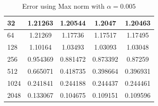 \begin{table}[H]
\begin{tabular}{lcccc}
		\midrule
		\hspace{7mm} 32 & 1.21263  & 1.20544   & 1.2047    & 1.20463   \\
		\midrule
		\hspace{7mm} 64 & 1.21269  & 1.17736   & 1.17517   & 1.17495   \\
		\midrule
		\hspace{7mm} 128 & 1.10164  & 1.03493   & 1.03093   & 1.03048   \\
		\midrule
		\hspace{7mm} 256 & 0.954369 & 0.881472  & 0.873392  & 0.87259   \\
		\midrule
		\hspace{7mm} 512 & 0.665071 & 0.418735  & 0.398664  & 0.396931  \\
		\midrule
		\hspace{7mm} 1024 & 0.241841 & 0.244188  & 0.244437  & 0.244461  \\
		\midrule
		\hspace{7mm} 2048 & 0.133067 & 0.104675  & 0.109151  & 0.109596  \\
		\bottomrule
	\end{tabular}
	\caption{Error using Max norm with $\alpha =0.005$}
	\label{Galerkin_tabla_max_alpha=005}
	\end{table}
	
	\newpage
